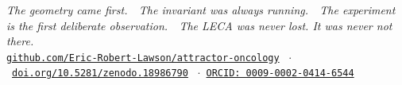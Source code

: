 \documentclass[9.5pt, a4paper]{article}
\begin{document}
\begin{center}
\footnotesize
\textit{The geometry came first.\ \
The invariant was always running.\ \
The experiment is the first deliberate observation.\ \
The LECA was never lost. It was never not there.}\\[0.15em]
\href{https://github.com/Eric-Robert-Lawson/attractor-oncology}
{\texttt{github.com/Eric-Robert-Lawson/attractor-oncology}}
\ $\cdot$\
\href{https://doi.org/10.5281/zenodo.18986790}
{\texttt{doi.org/10.5281/zenodo.18986790}}
\ $\cdot$\
\href{https://orcid.org/0009-0002-0414-6544}
{\texttt{ORCID: 0009-0002-0414-6544}}
\end{center}
\end{document}
